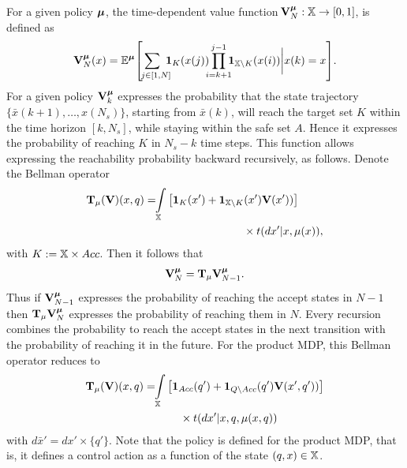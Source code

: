\documentclass{ifacconf}
\newcommand{\new}[1]{{\color{blue}#1}}
\newcommand{\ind}{\mathbf{1}}
\begin{document}
\new{
For a given
policy ${\boldsymbol{\mu}}$, the time-dependent value function $\!\mathbf V^{\boldsymbol{\mu}}_N:{\mathbb{X}}\rightarrow [0,1]$,  is defined as 
\begin{align*}\mathbf V_N^\polb(\bar x)=\mathbb{E}^\polb\!\left[\,\sum\limits_{\mathclap{\ \  j\in [1,N]}} \,\, \ind_K(\bar x(j)) \prod\limits_{\mathclap{i=k+1}}^{j-1}\ind_{\bar{\X}\setminus K}(\bar x(i))\bigg|\bar x(k)=\bar x\right]\!.\end{align*}
For a given policy $\mathbf V^{\boldsymbol{\mu}}_k$ 
expresses the probability that the state trajectory $\{\bar x({k+1}),\ldots, x({N_s})\}$,
starting from $\bar x(k)$, will reach the target set $K$ within the time horizon $[k,N_s]$,
while staying within the safe set $A$. 
Hence it expresses the probability of reaching $K$ in $N_s-k$ time steps.}
%
\new{This function allows expressing the  reachability probability backward recursively,
as follows. 
Denote the Bellman operator
\begin{align}\label{eq:V_recopt_inf}
& \Bel_\pol (\mathbf  V)(x,q) =\!\!\int_{\bar\X}  \left[\mathbf 1_{K}(\bar x')+  \mathbf 1_{\bar \X\setminus K}( \bar x')\mathbf V( \bar x'))\right]\notag\\&\hspace{5cm}\hfill 
\times \bar{\tr}(d \bar x' |\bar x,\pol(\bar x)),
\end{align}
with $K:={\mathbb{X}} \times Acc$.
Then it follows that 
\begin{align}
\mathbf V^{\boldsymbol{\mu}}_{N} = 
 {\mathbf {T}}_{\mu} \mathbf V^{\boldsymbol{\mu}}_{N-1}  .\end{align}
Thus if $\mathbf V^{\boldsymbol{\mu}}_{N-1} $ expresses the probability of reaching the accept states in $N-1$ then $ {\mathbf {T}}_{\mu} \mathbf V^{\boldsymbol{\mu}}_{N} $ expresses the probability of reaching them in $N$.
Every recursion combines the probability to reach the accept states in the next transition with the probability of reaching it in the future.
For the product MDP, this Bellman operator reduces to 
\begin{align}\label{eq:V_recopt_inf_mu}
& \Bel_\pol (\mathbf V)(x,q) =\!\!\int_{\bar\X}  \left[\mathbf 1_{Acc}(q')+  \mathbf 1_{Q\setminus Acc}( q')\mathbf V( x', q'))\right]\notag\\&\hspace{3cm}\hfill 
\times \bar{\tr}(d \bar x' |x,q,\pol(x,q))
\end{align}
with $d \bar x'= d x'\times\{q'\}$. Note that the policy is defined for the product MDP, that is, it defines a control action as a function of the state $(q,x)\in\relax{\mathbb{X}}$.}
 
\end{document}
